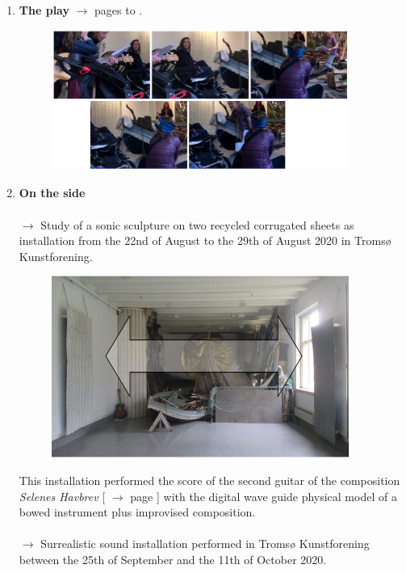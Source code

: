 \begin{enumerate}
\item \textbf{The play} $\rightarrow$ pages \pageref{shtp1} to \pageref{shtp2}. 
\begin{figure}[H]
\hfill \includegraphics[width=0.92\textwidth]{mp/img/img3}
\end{figure} 
\item \textbf{On the side} \\ \\ 
$\rightarrow$ Study of a sonic sculpture on two recycled corrugated sheets as installation from the 22nd of August to the 29th of August 2020 in Tromsø Kunstforening.
\begin{figure}[H]
\hfill \includegraphics[width=0.92\textwidth]{mp/img/img4}
\end{figure}
This installation performed the score of the second guitar of the composition \textsl{Selenes Havbrev} [ $\rightarrow$ page \pageref{sh} ] with the digital wave guide physical model of a bowed instrument plus improvised composition. \\ \\
$\rightarrow$ Surrealistic sound installation performed in Tromsø Kunstforening between the 25th of September and the 11th of October 2020. 
\begin{figure}[H]

\end{figure}
\end{enumerate}
